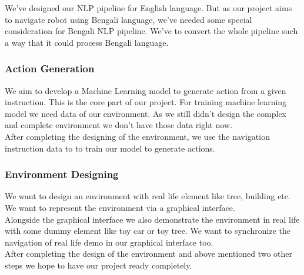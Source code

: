 We've designed our NLP pipeline for English language. But as our project aims to navigate robot using Bengali language, we've needed some special consideration for Bengali NLP pipeline. We've to convert the whole pipeline such a way that it could process Bengali language.


\subsubsection{Action Generation}
We aim to develop a Machine Learning model to generate action from a given instruction. This is the core part of our project. For training machine learning model we need data of our environment. As we still didn't design the complex and complete environment we don't have those data right now.\\

After completing the designing of the environment, we use the navigation instruction data to to train our model to generate actions.

\subsubsection{Environment Designing}
We want to design an environment with real life element like tree, building etc. We want to represent the environment via a graphical interface.\\

Alongside the graphical interface we also demonstrate the environment in real life with some dummy element like toy car or toy tree. We want to synchronize the navigation of real life demo in our graphical interface too.\\

After completing the design of the environment and above mentioned two other steps we hope to have our project ready completely. 
